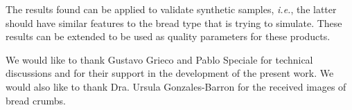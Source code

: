 The results found can be applied to validate synthetic samples, {\em i.e.}, the latter should have similar features to the bread type that is trying to simulate. These results can be extended to be used as quality parameters for these products.

\begin{acknowledgements}
We would like to thank Gustavo Grieco and Pablo Speciale for technical discussions and for their support in the development of the present work. We would also like to thank Dra. Ursula Gonzales-Barron for the received images of bread crumbs.
\end{acknowledgements}


%
%



